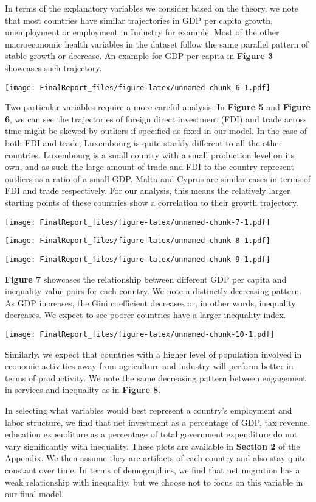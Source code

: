 \documentclass[
]{article}
\begin{document}
In terms of the explanatory variables we consider based on the theory,
we note that most countries have similar trajectories in GDP per capita
growth, unemployment or employment in Industry for example. Most of the
other macroeconomic health variables in the dataset follow the same
parallel pattern of stable growth or decrease. An example for GDP per
capita in \textbf{Figure 3} showcases such trajectory.

\texttt{[image: FinalReport\_files/figure-latex/unnamed-chunk-6-1.pdf]}

Two particular variables require a more careful analysis. In
\textbf{Figure 5} and \textbf{Figure 6}, we can see the trajectories of
foreign direct investment (FDI) and trade across time might be skewed by
outliers if specified as fixed in our model. In the case of both FDI and
trade, Luxembourg is quite starkly different to all the other countries.
Luxembourg is a small country with a small production level on its own,
and as such the large amount of trade and FDI to the country represent
outliers as a ratio of a small GDP. Malta and Cyprus are similar cases
in terms of FDI and trade respectively. For our analysis, this means the
relatively larger starting points of these countries show a correlation
to their growth trajectory.

\texttt{[image: FinalReport\_files/figure-latex/unnamed-chunk-7-1.pdf]}

\texttt{[image: FinalReport\_files/figure-latex/unnamed-chunk-8-1.pdf]}

\texttt{[image: FinalReport\_files/figure-latex/unnamed-chunk-9-1.pdf]}

\textbf{Figure 7} showcases the relationship between different GDP per
capita and inequality value pairs for each country. We note a distinctly
decreasing pattern. As GDP increases, the Gini coefficient decreases or,
in other words, inequality decreases. We expect to see poorer countries
have a larger inequality index.

\texttt{[image: FinalReport\_files/figure-latex/unnamed-chunk-10-1.pdf]}

Similarly, we expect that countries with a higher level of population
involved in economic activities away from agriculture and industry will
perform better in terms of productivity. We note the same decreasing
pattern between engagement in services and inequality as in
\textbf{Figure 8}.

In selecting what variables would best represent a country's employment
and labor structure, we find that net investment as a percentage of GDP,
tax revenue, education expenditure as a percentage of total government
expenditure do not vary significantly with inequality. These plots are
available in \textbf{Section 2} of the Appendix. We then assume they are
artifacts of each country and also stay quite constant over time. In
terms of demographics, we find that net migration has a weak
relationship with inequality, but we choose not to focus on this
variable in our final model.
\end{document}
